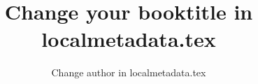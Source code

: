 

\title{Change your booktitle in localmetadata.tex}  %
\subtitle{}%
\dedication{Change dedication in localmetadata.tex}
\author{Change author in localmetadata.tex}
\renewcommand{\lsISBN}{978-3-000000-00-0}                     
\renewcommand{\lsSeries}{dummyseries}
\renewcommand{\lsSeriesNumber}{99}
\renewcommand{\lsURL}{http://langsci-press.org/catalog/book/0}
